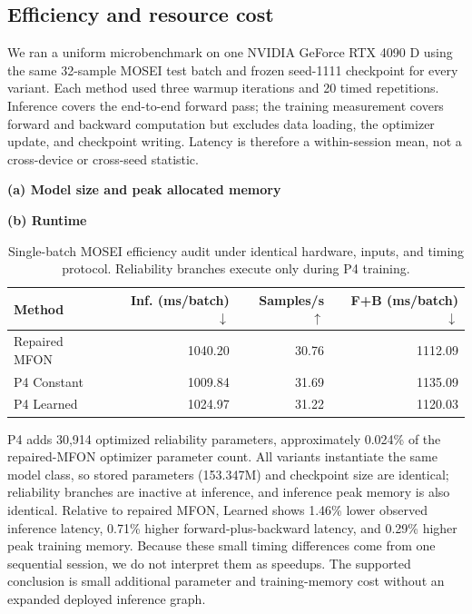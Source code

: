 \subsection{Efficiency and resource cost}\label{efficiency-audit}

We ran a uniform microbenchmark on one NVIDIA GeForce RTX 4090 D using the
same 32-sample MOSEI test batch and frozen seed-1111 checkpoint for every
variant. Each method used three warmup iterations and 20 timed repetitions.
Inference covers the end-to-end forward pass; the training measurement covers
forward and backward computation but excludes data loading, the optimizer
update, and checkpoint writing. Latency is therefore a within-session mean,
not a cross-device or cross-seed statistic.

\begin{table}[t]
\caption{Single-batch MOSEI efficiency audit under identical hardware,
inputs, and timing protocol. Reliability branches execute only during P4
training.}
\label{tab:efficiency-audit}
\centering
\small
\textbf{(a) Model size and peak allocated memory}\par\smallskip
{}

\vspace{0.7em}
\textbf{(b) Runtime}\par\smallskip
\begin{tabular}{lrrr}
\toprule
Method & Inf. (ms/batch) $\downarrow$ & Samples/s $\uparrow$
& F+B (ms/batch) $\downarrow$ \\
\midrule
Repaired MFON & 1040.20 & 30.76 & 1112.09 \\
P4 Constant & 1009.84 & 31.69 & 1135.09 \\
P4 Learned & 1024.97 & 31.22 & 1120.03 \\
\bottomrule
\end{tabular}
\end{table}

P4 adds 30,914 optimized reliability parameters, approximately 0.024\% of
the repaired-MFON optimizer parameter count. All variants instantiate the
same model class, so stored parameters (153.347M) and checkpoint size are
identical; reliability branches are inactive at inference, and inference peak
memory is also identical. Relative to repaired MFON, Learned shows 1.46\%
lower observed inference latency, 0.71\% higher forward-plus-backward latency,
and 0.29\% higher peak training memory. Because these small timing differences
come from one sequential session, we do not interpret them as speedups. The
supported conclusion is small additional parameter and training-memory cost
without an expanded deployed inference graph.


